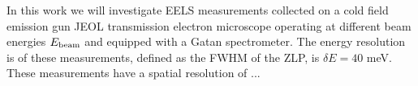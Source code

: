 In this work we will investigate EELS measurements collected  on a cold field emission gun JEOL
transmission electron microscope operating at different beam energies $E_{\rm beam}$
and equipped with a  Gatan spectrometer.
%
The energy resolution is of these measurements,
defined as the FWHM of the ZLP, is $\delta E=40$ meV.
%
These measurements have a spatial resolution of ...

